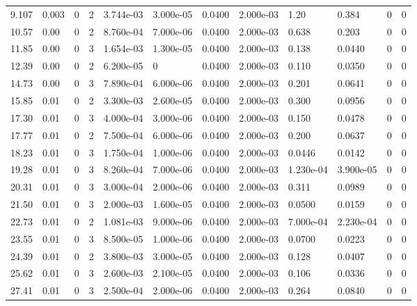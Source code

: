 \documentclass[preview]{standalone}
\begin{document}
{{\begin{tabular}{L{1.2cm}C{1.2cm} C{0.3cm}C{0.5cm} C{1.4cm}C{1.4cm} C{1.4cm}C{1.4cm} C{1.6cm}C{1.6cm} C{1.6cm}C{1.6cm}}
  9.107  &  0.003  & 0     &  2 &  3.744e-03  & 3.000e-05  &  0.0400&   2.000e-03& 1.20 & 0.384   &  0 & 0  \\ 
  10.57  &  0.00  & 0     &  2 &  8.760e-04  & 7.000e-06  &  0.0400&   2.000e-03& 0.638 & 0.203   &  0 & 0  \\ 
  11.85  &  0.00  & 0     &  3 &  1.654e-03  & 1.300e-05  &  0.0400&   2.000e-03& 0.138 & 0.0440   &  0 & 0  \\ 
  12.39  &  0.00  & 0     &  2 &  6.200e-05  & 0  &  0.0400&   2.000e-03& 0.110 & 0.0350   &  0 & 0  \\ 
  14.73  &  0.00  & 0     &  3 &  7.890e-04  & 6.000e-06  &  0.0400&   2.000e-03& 0.201 & 0.0641   &  0 & 0  \\ 
  15.85  &  0.01  & 0     &  2 &  3.300e-03  & 2.600e-05  &  0.0400&   2.000e-03& 0.300 & 0.0956   &  0 & 0  \\ 
  17.30  &  0.01  & 0     &  3 &  4.000e-04  & 3.000e-06  &  0.0400&   2.000e-03& 0.150 & 0.0478   &  0 & 0  \\ 
  17.77  &  0.01  & 0     &  2 &  7.500e-04  & 6.000e-06  &  0.0400&   2.000e-03& 0.200 & 0.0637   &  0 & 0  \\ 
  18.23  &  0.01  & 0     &  3 &  1.750e-04  & 1.000e-06  &  0.0400&   2.000e-03& 0.0446 & 0.0142   &  0 & 0  \\ 
  19.28  &  0.01  & 0     &  3 &  8.260e-04  & 7.000e-06  &  0.0400&   2.000e-03& 1.230e-04 & 3.900e-05   &  0 & 0  \\ 
  20.31  &  0.01  & 0     &  3 &  3.000e-04  & 2.000e-06  &  0.0400&   2.000e-03& 0.311 & 0.0989   &  0 & 0  \\ 
  21.50  &  0.01  & 0     &  3 &  2.000e-03  & 1.600e-05  &  0.0400&   2.000e-03& 0.0500 & 0.0159   &  0 & 0  \\ 
  22.73  &  0.01  & 0     &  2 &  1.081e-03  & 9.000e-06  &  0.0400&   2.000e-03& 7.000e-04 & 2.230e-04   &  0 & 0  \\ 
  23.55  &  0.01  & 0     &  3 &  8.500e-05  & 1.000e-06  &  0.0400&   2.000e-03& 0.0700 & 0.0223   &  0 & 0  \\ 
  24.39  &  0.01  & 0     &  2 &  3.800e-03  & 3.000e-05  &  0.0400&   2.000e-03& 0.128 & 0.0407   &  0 & 0  \\ 
  25.62  &  0.01  & 0     &  3 &  2.600e-03  & 2.100e-05  &  0.0400&   2.000e-03& 0.106 & 0.0336   &  0 & 0  \\ 
  27.41  &  0.01  & 0     &  3 &  2.500e-04  & 2.000e-06  &  0.0400&   2.000e-03& 0.264 & 0.0840   &  0 & 0  \\ 

\end{tabular}}}
\end{document}
